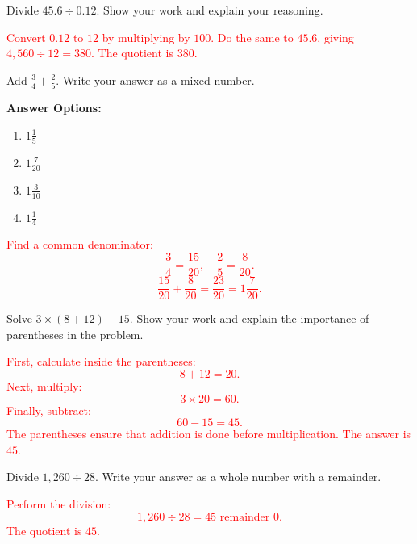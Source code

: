 \documentclass[12pt]{article}
\begin{document}
\begin{tcolorbox}[colframe=black!50, colback=white, title=\textbf{Problem 7 (5.NBT.B.7)}]
Divide \(45.6 \div 0.12\). Show your work and explain your reasoning.

\textcolor{red}{Convert \(0.12\) to \(12\) by multiplying by \(100\). Do the same to \(45.6\), giving \(4,560 \div 12 = 380\).  
The quotient is \(380\).}
\end{tcolorbox}

\begin{tcolorbox}[colframe=black!50, colback=white, title=\textbf{Problem 8 (5.NF.A.1)}]
Add \( \frac{3}{4} + \frac{2}{5} \). Write your answer as a mixed number.

\textbf{Answer Options:}
\begin{enumerate}[label=(\Alph*), itemsep=0.5cm]
    \item \(1\frac{1}{5}\)
    \item \textbf{\(1\frac{7}{20}\)}
    \item \(1\frac{3}{10}\)
    \item \(1\frac{1}{4}\)
\end{enumerate}

\textcolor{red}{Find a common denominator:
\[
\frac{3}{4} = \frac{15}{20}, \quad \frac{2}{5} = \frac{8}{20}.
\]  
\[
\frac{15}{20} + \frac{8}{20} = \frac{23}{20} = 1\frac{7}{20}.
\]}
\end{tcolorbox}

\begin{tcolorbox}[colframe=black!50, colback=white, title=\textbf{Problem 9 (5.NBT.A.3)}]
Solve \(3 \times (8 + 12) - 15\). Show your work and explain the importance of parentheses in the problem.

\textcolor{red}{First, calculate inside the parentheses:  
\[
8 + 12 = 20.
\]  
Next, multiply:  
\[
3 \times 20 = 60.
\]  
Finally, subtract:  
\[
60 - 15 = 45.
\]  
The parentheses ensure that addition is done before multiplication. The answer is \(45\).}
\end{tcolorbox}

\begin{tcolorbox}[colframe=black!50, colback=white, title=\textbf{Problem 10 (5.NBT.6)}]
Divide \(1,260 \div 28\). Write your answer as a whole number with a remainder.

\textcolor{red}{Perform the division:  
\[
1,260 \div 28 = 45 \text{ remainder } 0.
\]  
The quotient is \(45\).}
\end{tcolorbox}
\end{document}
